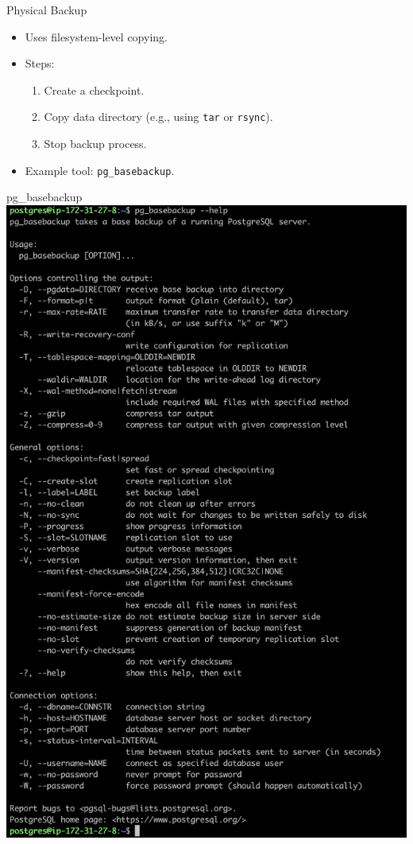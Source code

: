 \documentclass[aspectratio=169]{beamer}
\begin{document}
\begin{frame}{Physical Backup}
    \begin{itemize}
        \item Uses filesystem-level copying.
        \item Steps:
        \begin{enumerate}
            \item Create a checkpoint.
            \item Copy data directory (e.g., using \texttt{tar} or \texttt{rsync}).
            \item Stop backup process.
        \end{enumerate}
        \item Example tool: \texttt{pg\_basebackup}.
    \end{itemize}
\end{frame}

\begin{frame}{pg\_basebackup}
    \centering
    \includegraphics[width=\textwidth, trim={0cm 68cm 0cm 0cm}, clip]{figures/pg_basebackup}
\end{frame}
\end{document}
